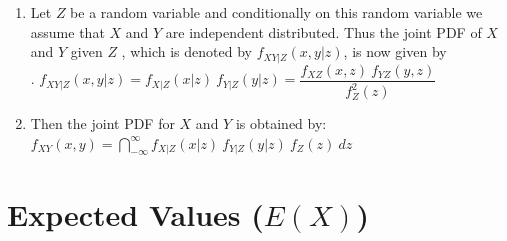 \begin{enumerate}
    \item Let $Z$ be a random variable and conditionally on this random variable we assume that $X$ and $Y$ are independent distributed.
    Thus the joint PDF of $X$ and $Y$ given $Z$ , which is denoted by $f _{X Y |Z} (x, y|z)$, is now given by
    \hfill \cite{statistics/book/Statistics-for-Data-Scientists/Maurits-Kaptein}
    \\
    .\hfill
    $
        f_{X Y |Z} (x, y|z)
        = f _{X|Z} (x|z)\ f_{Y |Z} (y|z)
        = \dfrac{f_{X Z} (x, z)\ f_{Y Z} (y, z) } {f^2_Z (z)}
    $
    \hfill \cite{statistics/book/Statistics-for-Data-Scientists/Maurits-Kaptein}

    \item Then the joint PDF for $X$ and $Y$ is obtained by:
    $
        f _{X Y} (x, y)
        = \dint ^{\infty }_{-\infty} f_{X|Z} (x|z)\ f_{Y |Z} (y|z)\ f_Z (z)\ dz
    $
    \hfill \cite{statistics/book/Statistics-for-Data-Scientists/Maurits-Kaptein}
\end{enumerate}















\section{Expected Values ($E(X)$)}

